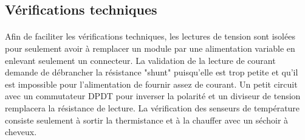 	\subsection{Vérifications techniques}
	\paragraph*{}
	Afin de faciliter les vérifications techniques, les lectures de tension sont isolées pour seulement avoir à remplacer un module par une alimentation variable en enlevant seulement un connecteur. La validation de la lecture de courant demande de débrancher la résistance "shunt" puisqu'elle est trop petite et qu'il est impossible pour l'alimentation de fournir assez de courant. Un petit circuit avec un commutateur DPDT pour inverser la polarité et un diviseur de tension remplacera la résistance de lecture. La vérification des senseurs de température consiste seulement à sortir la thermistance et à la chauffer avec un séchoir à cheveux. 